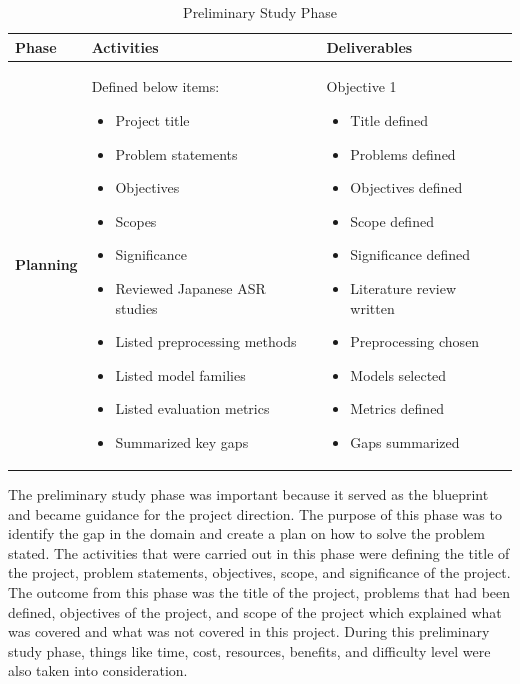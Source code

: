 \begin{table}[H]
\centering
\caption{Preliminary Study Phase}
\label{tab:planning}
{\small
\setlength{\tabcolsep}{6pt}
\renewcommand{\arraystretch}{1.5}

\begin{tabular}{ p{2.8cm}  p{5.3cm}  p{5.3cm}  }
\hline
\textbf{Phase} & \textbf{Activities} & \textbf{Deliverables} \\
\hline 

\textbf{Planning} &
Defined below items: 
\begin{itemize}[leftmargin=*, nosep]
  \item Project title
  \item Problem statements
  \item Objectives
  \item Scopes
  \item Significance
  \item Reviewed Japanese ASR studies
  \item Listed preprocessing methods
  \item Listed model families
  \item Listed evaluation metrics
  \item Summarized key gaps
\end{itemize}
&
Objective 1
\begin{itemize}[leftmargin=*, nosep]
  \item Title defined
  \item Problems defined
  \item Objectives defined
  \item Scope defined
  \item Significance defined
  \item Literature review written
  \item Preprocessing chosen
  \item Models selected
  \item Metrics defined
  \item Gaps summarized
\end{itemize}
\\ \hline

\end{tabular}}  
\end{table}

The preliminary study phase was important because it served as the blueprint and became guidance for the project direction. The purpose of this phase was to identify the gap in the domain and create a plan on how to solve the problem stated. The activities that were carried out in this phase were defining the title of the project, problem statements, objectives, scope, and significance of the project. The outcome from this phase was the title of the project, problems that had been defined, objectives of the project, and scope of the project which explained what was covered and what was not covered in this project. During this preliminary study phase, things like time, cost, resources, benefits, and difficulty level were also taken into consideration.

